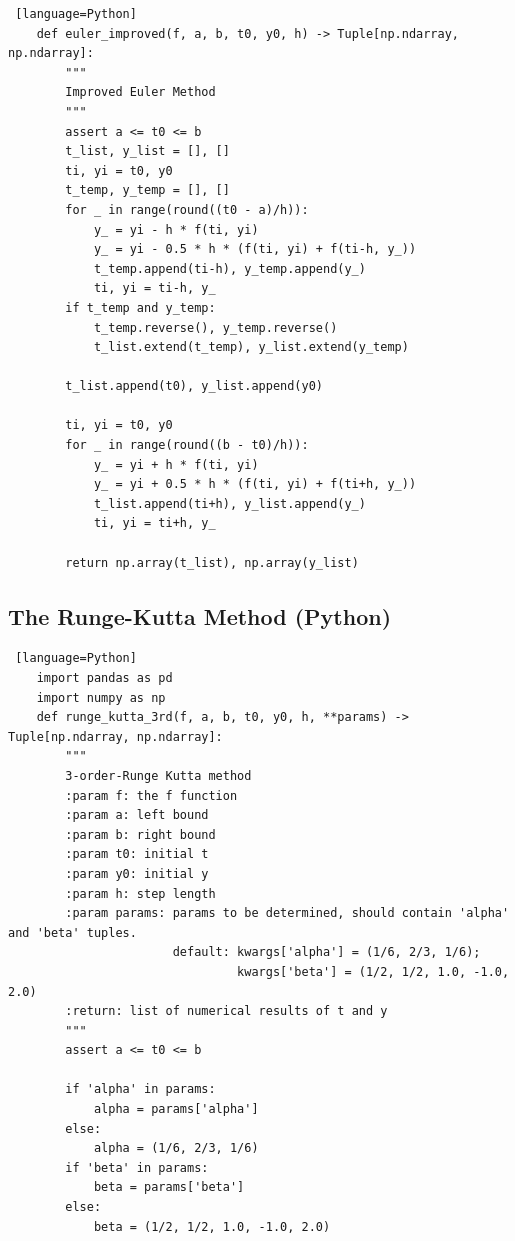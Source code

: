 \documentclass[a4paper]{article}
\begin{document}
\begin{appendices}
\begin{lstlisting} [language=Python]
    def euler_improved(f, a, b, t0, y0, h) -> Tuple[np.ndarray, np.ndarray]:
        """
        Improved Euler Method
        """
        assert a <= t0 <= b
        t_list, y_list = [], []
        ti, yi = t0, y0
        t_temp, y_temp = [], []
        for _ in range(round((t0 - a)/h)):
            y_ = yi - h * f(ti, yi)
            y_ = yi - 0.5 * h * (f(ti, yi) + f(ti-h, y_))
            t_temp.append(ti-h), y_temp.append(y_)
            ti, yi = ti-h, y_
        if t_temp and y_temp:
            t_temp.reverse(), y_temp.reverse()
            t_list.extend(t_temp), y_list.extend(y_temp)
    
        t_list.append(t0), y_list.append(y0)
    
        ti, yi = t0, y0
        for _ in range(round((b - t0)/h)):
            y_ = yi + h * f(ti, yi)
            y_ = yi + 0.5 * h * (f(ti, yi) + f(ti+h, y_))
            t_list.append(ti+h), y_list.append(y_)
            ti, yi = ti+h, y_
    
        return np.array(t_list), np.array(y_list)

    \end{lstlisting}
    
    \clearpage
    
    \subsection{The Runge-Kutta Method (Python)}
    
    \begin{lstlisting} [language=Python]
    import pandas as pd
    import numpy as np
    def runge_kutta_3rd(f, a, b, t0, y0, h, **params) -> Tuple[np.ndarray, np.ndarray]:
        """
        3-order-Runge Kutta method
        :param f: the f function
        :param a: left bound
        :param b: right bound
        :param t0: initial t
        :param y0: initial y
        :param h: step length
        :param params: params to be determined, should contain 'alpha' and 'beta' tuples.
                       default: kwargs['alpha'] = (1/6, 2/3, 1/6);
                                kwargs['beta'] = (1/2, 1/2, 1.0, -1.0, 2.0)
        :return: list of numerical results of t and y
        """
        assert a <= t0 <= b
    
        if 'alpha' in params:
            alpha = params['alpha']
        else:
            alpha = (1/6, 2/3, 1/6)
        if 'beta' in params:
            beta = params['beta']
        else:
            beta = (1/2, 1/2, 1.0, -1.0, 2.0)
    

\end{lstlisting}
\end{appendices}
\end{document}
